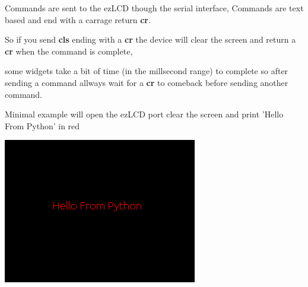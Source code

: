 Commands are sent to the ez\-L\-C\-D though the serial interface, Commands are text based and end with a carrage return {\bfseries cr}.\par
 So if you send {\bfseries cls} ending with a {\bfseries cr} the device will clear the screen and return a {\bfseries cr} when the command is complete,\par
 some widgets take a bit of time (in the millsecond range) to complete so after sending a command allways wait for a {\bfseries cr} to comeback before sending another command.\par
 

\par
 Minimal example will open the ez\-L\-C\-D port clear the screen and print 'Hello From Python' in red \par
  
\begin{DoxyImageNoCaption}
  \mbox{\includegraphics{minimal.png}}
\end{DoxyImageNoCaption}
 
